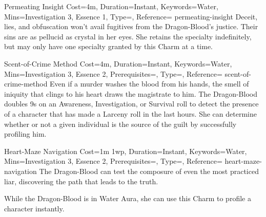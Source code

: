 
\begin{Charm}{Permeating Insight}{%
    Cost=4m,
    Duration=Instant,
    Keywords=Water,
    Mins={Investigation 3, Essence 1},
    Type=\SupplementalType,
    Reference=\cite*[p.~198]{db}
}{permeating-insight}
    Deceit, lies, and obfuscation won't avail fugitives from the Dragon-Blood's
    justice. Their sins are as pellucid as crystal in her eyes.  She retains the specialty
    indefinitely, but may only have one specialty granted by this Charm at a time.
\end{Charm}


\begin{Charm}{Scent-of-Crime Method}{%
    Cost=4m,
    Duration=Instant,
    Keywords=Water,
    Mins={Investigation 3, Essence 2},
    Prerequisites=,
    Type=\SupplementalType,
    Reference=\cite*[p.~198]{db}
}{scent-of-crime-method}
    Even if a murder washes the blood from his hands, the smell of iniquity that
    clings to his heart draws the magistrate to him. The Dragon-Blood doubles 9s on
    an Awareness, Investigation, or Survival roll to detect the presence of a
    character that has made a Larceny roll in the last \Pool{\EssenceVal} hours.
    She can determine whether or not a given individual is the source of the guilt
    by successfully profiling him.
\end{Charm}


\begin{Charm}{Heart-Maze Navigation}{%
    Cost=1m 1wp,
    Duration=Instant,
    Keywords=Water,
    Mins={Investigation 3, Essence 2},
    Prerequisites=,
    Type=\SupplementalType,
    Reference=\cite*[p.~198]{db}
}{heart-maze-navigation}
    The Dragon-Blood can test the composure of even the most practiced liar,
    discovering the path that leads to the truth. 

    While the Dragon-Blood is in Water Aura, she can use this Charm to profile a
    character instantly.
\end{Charm}


